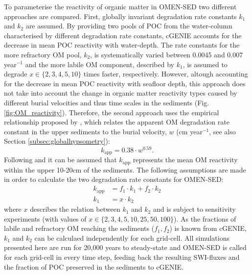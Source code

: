 \documentclass[gmd, manuscript]{copernicus}
\begin{document}
To parameterise the reactivity of organic matter in OMEN-SED two different approaches are compared. First, globally invariant degradation rate constants $k_1$ and $k_2$ are assumed. 
By providing two pools of POC from the water-column characterised by different degradation rate constants, cGENIE accounts for the decrease in mean POC reactivity with water-depth. 
The rate constants for the more refractory OM pool, $k_2$, is systematically varied between 0.0045 and 0.007 year$^{-1}$ and the more labile OM component, described by $k_1$, is assumed to degrade $x \in \{2, 3, 4, 5, 10\}$ times faster, respectively. 
However, altough accounting for the decrease in mean POC reactivity with seafloor depth, this approach does not take into account the change in organic matter reactivity types caused by different burial velocities and thus time scales in the sediments 
(Fig. \ref{fig:OM_reactivity}). 
Therefore, the second approach uses the empirical relationship proposed by \citet{boudreau1997diagenetic}, 
which relates the apparent OM degradation rate constant in the upper sediments to the burial velocity, $w$ (cm year$^{-1}$, see also Section \ref{subsec:globalhypsometry}):
\begin{equation}
 k_\mathrm{app} = 0.38 \cdot w^{0.59}.
\end{equation}
Following \citet{boudreau1997diagenetic} and \citet{stolpovsky_toward_2015} it can be assumed that $k_\mathrm{app}$ represents the mean OM reactivity within the upper 10-20cm of the sediments. 
The following assumptions are made in order to calculate the two degradation rate constants for OMEN-SED:
\begin{align}
  k_\mathrm{app} &= f_1 \cdot k_1 + f_2 \cdot k_2 \label{boudreau_assumption1}\\
  k_1 &= x \cdot k_2					\label{boudreau_assumption2}
\end{align}
where $x$ describes the relation between $k_1$ and $k_2$ and is subject to sensitivity experiments (with values of $x \in \{2, 3, 4, 5, 10, 25, 50, 100\}$). 
As the fractions of labile and refractory OM reaching the sediments ($f_1, f_2$) is known from cGENIE, $k_1$ and $k_2$ can be calculaed independently for each grid-cell. 
All simulations presented here are run for 20,000 years to steady-state and OMEN-SED is called for each grid-cell in every time step, feeding back the resulting SWI-fluxes and the 
fraction of POC preserved in the sediments to cGENIE. 
\end{document}
